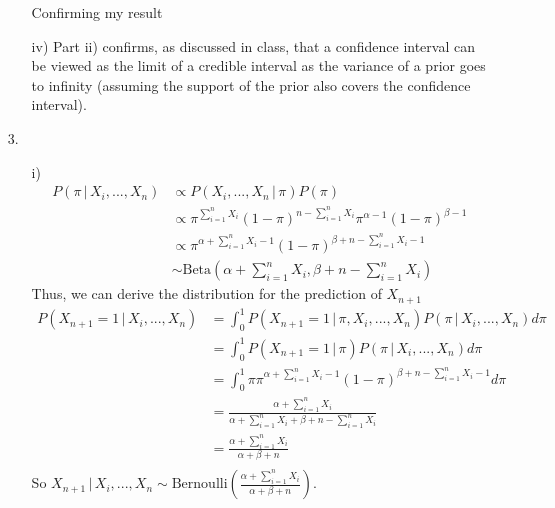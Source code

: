 \documentclass[11pt]{article}
\theoremstyle{definition}
\begin{document}
\begin{itemize}
\begin{itemize}
                Confirming my result
            \item[iv)]
                Part ii) confirms, as discussed in class, that a confidence interval can be viewed as the limit of a credible interval as the variance of a prior goes to infinity (assuming the support of the prior also covers the confidence interval). 
        \end{itemize}
    \item[3.]
        \begin{itemize}
            \item[i)]
                \begin{align*}
                    P(\pi \,|\, X_i,...,X_n) &\propto P( X_i,...,X_n \,|\, \pi )P(\pi) \\
                                             &\propto \pi^{\sum_{i=1}^n X_i}(1-\pi)^{n-\sum_{i=1}^n X_i}\pi^{\alpha-1}(1-\pi)^{\beta-1} \\
                                             &\propto \pi^{\alpha + \sum_{i=1}^n X_i - 1}(1-\pi)^{\beta+n-\sum_{i=1}^n X_i - 1} \\
                                             &\sim \mathrm{Beta}\left(\alpha + \sum_{i=1}^n X_i, \beta+n-\sum_{i=1}^n X_i\right)
                \end{align*}
                Thus, we can derive the distribution for the prediction of $X_{n+1}$
                \begin{align*}
                    P(X_{n+1}=1 \,|\,  X_i,...,X_n) &= \int_{0}^1 P(X_{n+1}=1 \,|\,\pi, X_i,...,X_n)P( \pi\,|\, X_i,...,X_n)d\pi \\
                                                    &= \int_{0}^1 P(X_{n+1}=1 \,|\,\pi)P( \pi\,|\, X_i,...,X_n)d\pi \\
                                                    &=\int_0^1 \pi\pi^{\alpha + \sum_{i=1}^n X_i - 1}(1-\pi)^{\beta+n-\sum_{i=1}^n X_i - 1}d\pi \\
                                                    &= \frac{\alpha + \sum_{i=1}^n X_i}{\alpha + \sum_{i=1}^n X_i+\beta+n-\sum_{i=1}^n X_i} \\
                                                    &= \frac{\alpha + \sum_{i=1}^n X_i}{\alpha +\beta+n} \\
                \end{align*}
                So \(X_{n+1} \,|\,  X_i,...,X_n \sim \mathrm{Bernoulli}\left(\frac{\alpha + \sum_{i=1}^n X_i}{\alpha +\beta+n}\right)\).


\end{itemize}
\end{itemize}
\end{document}
